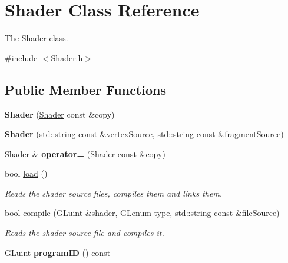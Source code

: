 \hypertarget{classShader}{}\section{Shader Class Reference}
\label{classShader}


The \hyperlink{classShader}{Shader} class.  




{\ttfamily \#include $<$Shader.\+h$>$}

\subsection*{Public Member Functions}
\begin{DoxyCompactItemize}
\item 
\hypertarget{classShader_a2676488e17d2c7adde4caa1b76c2d8f7}{}{\bfseries Shader} (\hyperlink{classShader}{Shader} const \&copy)\label{classShader_a2676488e17d2c7adde4caa1b76c2d8f7}

\item 
\hypertarget{classShader_a59b1b61c30690647dca39952ed58a277}{}{\bfseries Shader} (std\+::string const \&vertex\+Source, std\+::string const \&fragment\+Source)\label{classShader_a59b1b61c30690647dca39952ed58a277}

\item 
\hypertarget{classShader_a04809b02b4cd13ca28baeb911c1924c4}{}\hyperlink{classShader}{Shader} \& {\bfseries operator=} (\hyperlink{classShader}{Shader} const \&copy)\label{classShader_a04809b02b4cd13ca28baeb911c1924c4}

\item 
bool \hyperlink{classShader_aa9413a27c7e5247d67c624a561e31d3e}{load} ()
\begin{DoxyCompactList}\small\item\em Reads the shader source files, compiles them and links them. \end{DoxyCompactList}\item 
bool \hyperlink{classShader_aee927a450e958f2b6f38442bde03114e}{compile} (G\+Luint \&shader, G\+Lenum type, std\+::string const \&file\+Source)
\begin{DoxyCompactList}\small\item\em Reads the shader source file and compiles it. \end{DoxyCompactList}\item 
\hypertarget{classShader_a3168baec42843f55afee3e06f6a5932a}{}G\+Luint {\bfseries program\+I\+D} () const \label{classShader_a3168baec42843f55afee3e06f6a5932a}


\end{DoxyCompactItemize}
